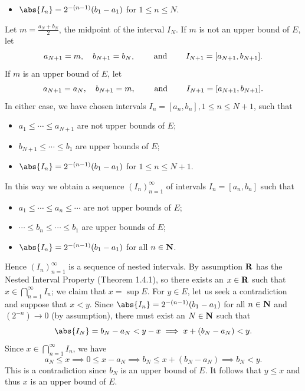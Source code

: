 \documentclass{lew98_solutions}
\begin{document}
\begin{solution}
\begin{itemize}
        \item \( \abs{I_n} = 2^{-(n-1)}(b_1 - a_1) \) for \( 1 \leq n \leq N \).
    \end{itemize}
    Let \( m = \tfrac{a_N + b_N}{2} \), the midpoint of the interval \( I_N \). If \( m \) is not an upper bound of \( E \), let
    \[
        a_{N+1} = m, \quad b_{N+1} = b_N, \hspace{8mm} \text{and} \hspace{8mm} I_{N+1} = [a_{N+1}, b_{N+1}].
    \]
    If \( m \) is an upper bound of \( E \), let
    \[
        a_{N+1} = a_N, \quad b_{N+1} = m, \hspace{8mm} \text{and} \hspace{8mm} I_{N+1} = [a_{N+1}, b_{N+1}].
    \]
    In either case, we have chosen intervals \( I_n = [a_n, b_n], 1 \leq n \leq N + 1 \), such that
    \begin{itemize}
        \item \( a_1 \leq \cdots \leq a_{N+1} \) are not upper bounds of \( E \);
        \item \( b_{N+1} \leq \cdots \leq b_1 \) are upper bounds of \( E \);
        \item \( \abs{I_n} = 2^{-(n-1)}(b_1 - a_1) \) for \( 1 \leq n \leq N + 1 \).
    \end{itemize}
    In this way we obtain a sequence \( (I_n)_{n=1}^{\infty} \) of intervals \( I_n = [a_n, b_n] \) such that
    \begin{itemize}
        \item \( a_1 \leq \cdots \leq a_n \leq \cdots \) are not upper bounds of \( E \);
        \item \( \cdots \leq b_n \leq \cdots \leq b_1 \) are upper bounds of \( E \);
        \item \( \abs{I_n} = 2^{-(n-1)}(b_1 - a_1) \) for all \( n \in \mathbf{N} \).
    \end{itemize}
    Hence \( (I_n)_{n=1}^{\infty} \) is a sequence of nested intervals. By assumption \( \mathbf{R} \) has the Nested Interval Property (Theorem 1.4.1), so there exists an \( x \in \mathbf{R} \) such that \( x \in \bigcap_{n=1}^{\infty} I_n \); we claim that \( x = \sup E \). For \( y \in E \), let us seek a contradiction and suppose that \( x < y \). Since \( \abs{I_n} = 2^{-(n-1)}(b_1 - a_1) \) for all \( n \in \mathbf{N} \) and \( (2^{-n}) \to 0 \) (by assumption), there must exist an \( N \in \mathbf{N} \) such that
    \[
        \abs{I_N} = b_N - a_N < y - x \implies x + (b_N - a_N) < y.
    \]
    Since \( x \in \bigcap_{n=1}^{\infty} I_n \), we have
    \[
        a_N \leq x \implies 0 \leq x - a_N \implies b_N \leq x + (b_N - a_N) \implies b_N < y.
    \]
    This is a contradiction since \( b_N \) is an upper bound of \( E \). It follows that \( y \leq x \) and thus \( x \)  is an upper bound of \( E \). 
    

\end{solution}
\end{document}
